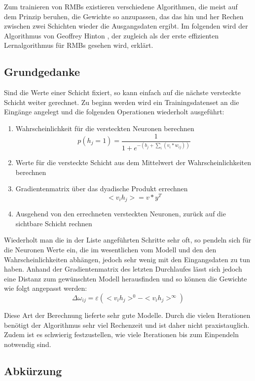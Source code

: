 Zum trainieren von RMBs existieren verschiedene Algorithmen, die meist auf dem Prinzip beruhen, die Gewichte so anzupassen, das das hin und her Rechen zwischen zwei Schichten wieder die Ausgangsdaten ergibt. Im folgenden wird der Algorithmus von Geoffrey Hinton , der zugleich als der erste effizienten Lernalgorithmus für RMBs gesehen wird, erklärt. 

\subsection{Grundgedanke}

Sind die Werte einer Schicht fixiert, so kann einfach auf die nächste versteckte Schicht weiter gerechnet. Zu beginn werden wird ein Trainingsdatenset an die Eingänge angelegt und die folgenden Operationen wiederholt ausgeführt:

\begin{enumerate}
\item Wahrscheinlichkeit für die versteckten Neuronen berechnen $$p(h_j=1) = \frac{1}{1+e^{-(b_j+\sum_{i}(v_i*w_{ij}))}}$$
\item Werte für die versteckte Schicht aus dem Mittelwert der Wahrscheinlichkeiten berechnen
\item Gradientenmatrix über das dyadische Produkt errechnen $$<v_ih_j> = v*y^T$$
\item Ausgehend von den errechneten versteckten Neuronen, zurück auf die sichtbare Schicht rechnen
\end{enumerate}

Wiederholt man die in der Liste angeführten Schritte sehr oft, so pendeln sich für die Neuronen Werte ein, die im wesentlichen vom Modell und den den Wahrscheinlichkeiten abhängen, jedoch sehr wenig mit den Eingangsdaten zu tun haben. Anhand der Gradientenmatrix des letzten Durchlaufes lässt sich jedoch eine Distanz zum gewünschten Modell herausfinden und so können die Gewichte wie folgt angepasst werden:
$$\Delta\omega_{ij} = \varepsilon (<v_ih_j>^0 -  <v_ih_j>^\infty)$$

Diese Art der Berechnung lieferte sehr gute Modelle. Durch die vielen Iterationen benötigt der Algorithmus sehr viel Rechenzeit und ist daher nicht praxistauglich. Zudem ist es schwierig festzustellen, wie viele Iterationen bis zum Einpendeln notwendig sind.

\subsection{Abkürzung}

